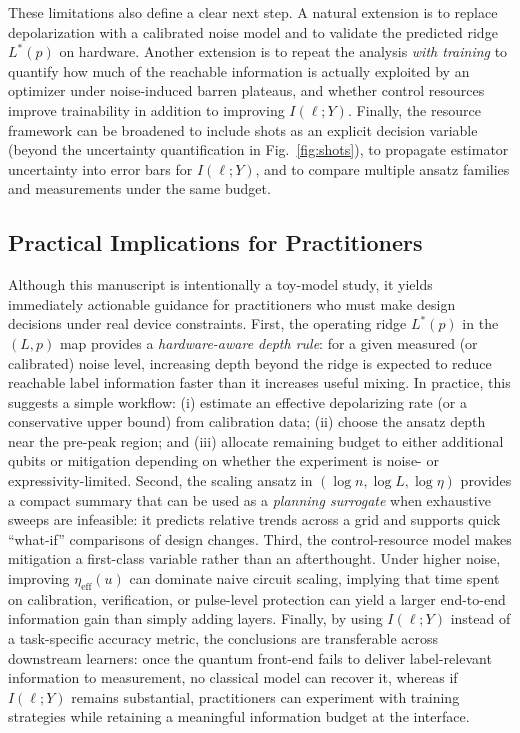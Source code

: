 \documentclass[journal]{IEEEtran}
\newcommand{\MI}{I(\ell;Y)}
\begin{document}
These limitations also define a clear next step. A natural extension is to replace depolarization with a calibrated noise model and to validate the predicted ridge $L^{\ast}(p)$ on hardware. Another extension is to repeat the analysis \emph{with training} to quantify how much of the reachable information is actually exploited by an optimizer under noise-induced barren plateaus, and whether control resources improve trainability in addition to improving $\MI$. Finally, the resource framework can be broadened to include shots as an explicit decision variable (beyond the uncertainty quantification in Fig.~\ref{fig:shots}), to propagate estimator uncertainty into error bars for $\MI$, and to compare multiple ansatz families and measurements under the same budget.

\subsection{Practical Implications for Practitioners}
Although this manuscript is intentionally a toy-model study, it yields immediately actionable guidance for practitioners who must make design decisions under real device constraints. First, the operating ridge $L^{\ast}(p)$ in the $(L,p)$ map provides a \emph{hardware-aware depth rule}: for a given measured (or calibrated) noise level, increasing depth beyond the ridge is expected to reduce reachable label information faster than it increases useful mixing. In practice, this suggests a simple workflow: (i) estimate an effective depolarizing rate (or a conservative upper bound) from calibration data; (ii) choose the ansatz depth near the pre-peak region; and (iii) allocate remaining budget to either additional qubits or mitigation depending on whether the experiment is noise- or expressivity-limited. Second, the scaling ansatz in $(\log n,\log L,\log\eta)$ provides a compact summary that can be used as a \emph{planning surrogate} when exhaustive sweeps are infeasible: it predicts relative trends across a grid and supports quick ``what-if'' comparisons of design changes. Third, the control-resource model makes mitigation a first-class variable rather than an afterthought. Under higher noise, improving $\eta_{\mathrm{eff}}(u)$ can dominate naive circuit scaling, implying that time spent on calibration, verification, or pulse-level protection can yield a larger end-to-end information gain than simply adding layers. Finally, by using $\MI$ instead of a task-specific accuracy metric, the conclusions are transferable across downstream learners: once the quantum front-end fails to deliver label-relevant information to measurement, no classical model can recover it, whereas if $\MI$ remains substantial, practitioners can experiment with training strategies while retaining a meaningful information budget at the interface.
\end{document}
